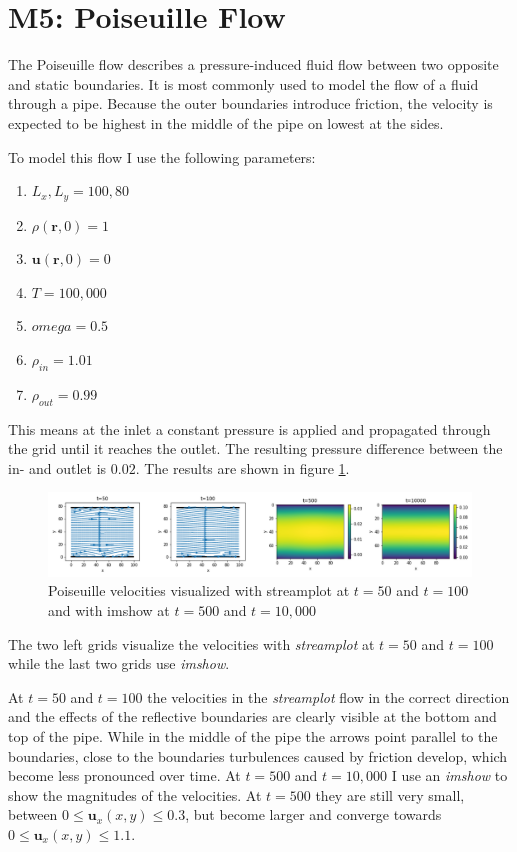 \documentclass[a4paper,12pt, oneside]{book}
\begin{document}
\section{M5: Poiseuille Flow}
The Poiseuille flow describes a pressure-induced fluid flow between two opposite and static boundaries. 
It is most commonly used to model the flow of a fluid through a pipe. 
Because the outer boundaries introduce friction, the velocity is expected to be highest in the middle of the pipe on lowest at the sides.

To model this flow I use the following parameters:
\begin{enumerate}
    \item $L_{x}, L_{y} = 100, 80$
    \item $\rho(\textbf{r}, 0) = 1$
    \item $\textbf{u}(\textbf{r}, 0) = 0$
    \item $T = 100,000$
    \item $omega = 0.5$
    \item $\rho_{in} = 1.01$
    \item $\rho_{out} = 0.99$
\end{enumerate}
This means at the inlet a constant pressure is applied and propagated through the grid until it reaches the outlet. The resulting pressure difference between the in- and outlet is $0.02$. 
The results are shown in figure \ref{fig:m5-1-vel-time}.
\begin{figure}[ht]
\centering
\includegraphics[width=\columnwidth]{milestones/final/img/m5-1-vel-time.png}
\vspace*{-4mm}
\caption[Poiseuille Velocities]{Poiseuille velocities visualized with streamplot at $t=50$ and $t=100$ and with imshow at $t=500$ and $t=10,000$ }
\label{fig:m5-1-vel-time}
\end{figure}
The two left grids visualize the velocities with \textit{streamplot} at $t=50$ and $t=100$ while the last two grids use \textit{imshow}. 

At $t=50$ and $t=100$ the velocities in the \textit{streamplot} flow in the correct direction and the effects of the reflective boundaries are clearly visible at the bottom and top of the pipe. While in the middle of the pipe the arrows point parallel to the boundaries, close to the boundaries turbulences caused by friction develop, which become less pronounced over time.
At $t=500$ and $t=10,000$ I use an \textit{imshow} to show the magnitudes of the velocities.
At $t=500$ they are still very small, between $0\leq\textbf{u}_{x}(x,y)\leq0.3$, but become larger and converge towards $0\leq\textbf{u}_{x}(x,y)\leq1.1$.
\end{document}
